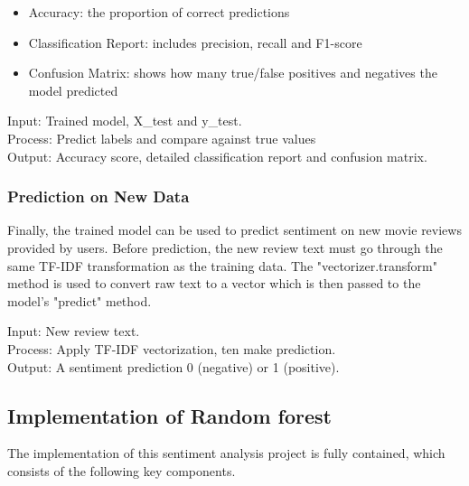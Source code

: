 \begin{itemize}
    \item Accuracy: the proportion of correct predictions
    \item Classification Report: includes precision, recall and F1-score
    \item Confusion Matrix: shows how many true/false positives and negatives the model predicted
\end{itemize}

Input: Trained model, X\_test and y\_test. \\
Process: Predict labels and compare against true values \\
Output: Accuracy score, detailed classification report and confusion matrix.

\subsubsection*{Prediction on New Data}
Finally, the trained model can be used to predict sentiment on new movie reviews provided by users. Before prediction, the new review text must go through the same TF-IDF transformation as the training data.
The "vectorizer.transform" method is used to convert raw text to a vector which is then passed to the model's "predict" method.

Input: New review text. \\
Process: Apply TF-IDF vectorization, ten make prediction. \\
Output: A sentiment prediction 0 (negative) or 1 (positive).


\subsection{Implementation of Random forest}
The implementation of this sentiment analysis project is fully contained, which consists of the following key components.

